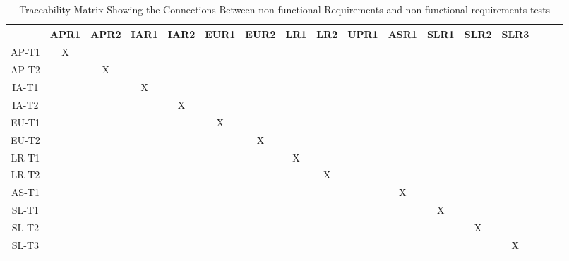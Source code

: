 \documentclass[12pt, titlepage]{article}
\begin{document}
\begin{landscape}
\begin{table}[h!]
\centering
\begin{tabular}{|c|c|c|c|c|c|c|c|c|c|c|c|c|c|c|c|c|}
\hline
	& APR1 & APR2 & IAR1 & IAR2 & EUR1 & EUR2 & LR1 & LR2 & UPR1 & ASR1 & SLR1 & SLR2 & SLR3\\
\hline
AP-T1        &X & & & & & & & & & & & & \\ \hline
AP-T2        & &X & & & & & & & & & & & \\ \hline
IA-T1        & & &X & & & & & & & & & & \\ \hline
IA-T2        & & & &X & & & & & & & & & \\ \hline
EU-T1        & & & & &X & & & & & & & & \\ \hline
EU-T2        & & & & & &X & & & & & & & \\ \hline
LR-T1        & & & & & & &X & & & & & & \\ \hline
LR-T2        & & & & & & & &X & & & & & \\ \hline
AS-T1        & & & & & & & & & &X & & & \\ \hline
SL-T1        & & & & & & & & & & &X & & \\ \hline
SL-T2        & & & & & & & & & & & &X & \\ \hline
SL-T3        & & & & & & & & & & & & &X \\ \hline

\end{tabular}
\caption{Traceability Matrix Showing the Connections Between non-functional Requirements and non-functional requirements tests}
\label{Table:A_trace}
\end{table}
\end{landscape}
\end{document}
